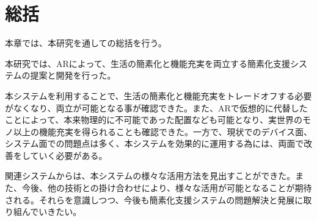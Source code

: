 
\chapter{総括}
\label{chap:summary}

本章では、本研究を通しての総括を行う。

\newpage

本研究では、ARによって、生活の簡素化と機能充実を両立する簡素化支援システムの提案と開発を行った。

本システムを利用することで、生活の簡素化と機能充実をトレードオフする必要がなくなり、両立が可能となる事が確認できた。また、ARで仮想的に代替したことによって、本来物理的に不可能であった配置なども可能となり、実世界のモノ以上の機能充実を得られることも確認できた。一方で、現状でのデバイス面、システム面での問題点は多く、本システムを効果的に運用する為には、両面で改善をしていく必要がある。

関連システムからは、本システムの様々な活用方法を見出すことができた。また、今後、他の技術との掛け合わせにより、様々な活用が可能となることが期待される。それらを意識しつつ、今後も簡素化支援システムの問題解決と発展に取り組んでいきたい。